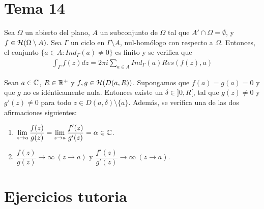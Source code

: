 \documentclass[12pt]{article}
\begin{document}
    \newpage

    \section{Tema 14}

    \begin{teo}
        Sea $\Omega$ un abierto del plano, $A$ un subconjunto de $\Omega$ tal que $A'\cap \Omega = \emptyset$, y $f\in \mathcal{H}(\Omega \setminus A)$. Sea $\Gamma$ un ciclo en $\Gamma \setminus A$, nul-homólogo con respecto a $\Omega$. Entonces, el conjunto $\{a\in A : Ind_\Gamma(a)\neq 0\}$ es finito y se verifica que
        \begin{gather*}
            \int_\Gamma f(z)dz = 2\pi i \sum\limits_{a\in A} Ind_\Gamma (a) Res(f(z), a)
        \end{gather*}
    \end{teo}

    \begin{teo} Sean $a\in \mathbb{C}$, $R\in \mathbb{R}^+$ y $f,g\in \mathcal{H}(D(a, R))$. Supongamos que $f(a)=g(a)=0$ y que $g$ no es idénticamente nula. Entonces existe un $\delta \in ]0,R[$, tal que $g(z)\neq 0$ y $g'(z)\neq 0$ para todo $z\in D(a, \delta)\setminus \{a\}$. Además, se verifica una de las dos afirmaciones siguientes:
    \begin{enumerate}
        \item $\displaystyle \lim\limits_{z\to a} \frac{f(z)}{g(z)} = \lim\limits_{z\to a} \frac{f'(z)}{g'(z)} = \alpha \in \mathbb{C}$.
        \item $\dfrac{f(z)}{g(z)} \to \infty\  (z \to a)$ y $\dfrac{f'(z)}{g'(z)} \to \infty\ (z \to a)$.
    \end{enumerate}
        
    \end{teo}

    \newpage

    \section{Ejercicios tutoria}
\end{document}
